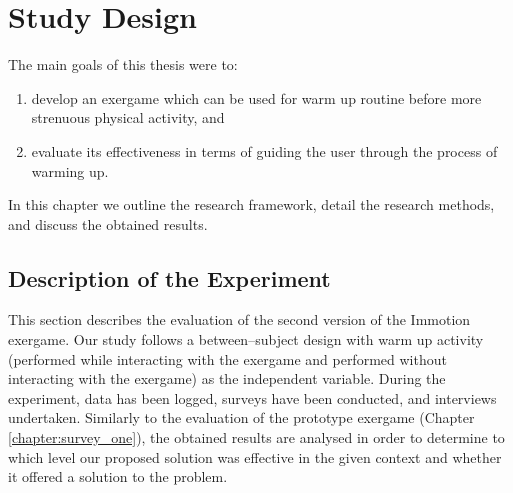 \chapter{Study Design}\label{chapter:studydesign}
The main goals of this thesis were to:
\begin{enumerate}
\item develop an exergame which can be used for warm up routine before more strenuous physical activity, and
\item evaluate its effectiveness in terms of guiding the user through the process of warming up.
\end{enumerate} In this chapter we outline the research framework, detail the research methods, and discuss the obtained results.
\section{Description of the Experiment}
This section describes the evaluation of the second version of the Immotion exergame. Our study follows a between–subject design with warm up activity (performed while
interacting with the exergame and performed without interacting with the exergame) as the independent
variable. During the experiment, data has been logged, surveys have been conducted, and interviews undertaken. Similarly to the evaluation of the prototype exergame (Chapter \ref{chapter:survey_one}), the obtained results are analysed in order to determine to which level our proposed solution was effective in the given context and whether it offered a solution to the problem. %

